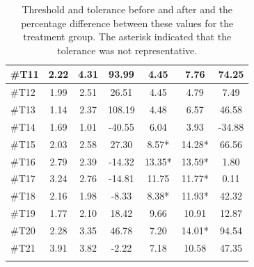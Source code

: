 \begin{longtable} {l|c|c|c|c|c|c}
\#T11 & 2.22 & 4.31 & 93.99 & 4.45 & 7.76 & 74.25 \\ \hline
\#T12 & 1.99 & 2.51 & 26.51 & 4.45 & 4.79 & 7.49 \\ \hline
\#T13 & 1.14 & 2.37 & 108.19 & 4.48 & 6.57 & 46.58 \\ \hline
\#T14 & 1.69 & 1.01 & -40.55 & 6.04 & 3.93 & -34.88 \\ \hline
\#T15 & 2.03 & 2.58 & 27.30 & 8.57* & 14.28* & 66.56 \\ \hline
\#T16 & 2.79 & 2.39 & -14.32 & 13.35* & 13.59* & 1.80 \\ \hline
\#T17 & 3.24 & 2.76 & -14.81 & 11.75 & 11.77* & 0.11 \\ \hline
\#T18 & 2.16 & 1.98 & -8.33 & 8.38* & 11.93* & 42.32 \\ \hline
\#T19 & 1.77 & 2.10 & 18.42 & 9.66 & 10.91 & 12.87  \\ \hline
\#T20 & 2.28 & 3.35 & 46.78 & 7.20  & 14.01* & 94.54 \\ \hline
\#T21 & 3.91 &  3.82 & -2.22 & 7.18 & 10.58 & 47.35 \\ \hline
	\caption{Threshold and tolerance before and after and the percentage difference between these values for the treatment group. The asterisk indicated that the tolerance was not representative.}
	\label{tab:Treatment}
\end{longtable}
\vspace{-.5cm}

